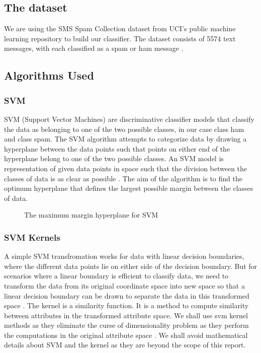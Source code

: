 \documentclass[9pt,twocolumn,twoside]{../../styles/osajnl}
\begin{document}
{\subsection{The dataset}
We are using the SMS Spam Collection dataset from UCI's
public machine learning repository to build our classifier. The
dataset consists of 5574 text messages, with each classified as a spam
or ham message \cite{www-sms_spam_collection}.

\subsection{Algorithms Used}

\subsubsection{SVM}
SVM (Support Vector Machines) are discriminative classifier models
that classify the data as belonging to one of the two possible
classes, in our case class ham and class spam. The SVM algorithm
attempts to categorize data by drawing a hyperplane between the data
points such that points on either end of the hyperplane belong to one
of the two possible classes. An SVM model is representation of given
data points in space such that the division between the classes of
data is as clear as possible \cite{www-svm-wiki}. The aim of the algorithm
is to find the optimum hyperplane that defines the largest possible
margin between the classes of data.

\begin{figure}[htbp]
\centering
{}
\caption{The maximum margin hyperplane for SVM \cite{www-svm-tutorial}}
\label{fig:The maximum margin hyperplane for SVM}
\end{figure}

\subsubsection{SVM Kernels}
A simple SVM transfromation works for data with linear decision
boundaries, where the different data points lie on either side of the
decision boundary. But for scenarios where a linear boundary is
efficient to classify data, we need to transform the data from its
original coordinate space into new space so that a linear decision
boundary can be drawn to separate the data in this transformed space
\cite{book-dataminingintroduction}. The kernel is a similarity
function. It is a method to compute similarity between attributes in
the transformed attribute space. We shall use svm kernel methods as
they eliminate the curse of dimensionality problem as they perform the
computations in the original attribute space
\cite{book-dataminingintroduction}. We shall avoid mathematical
details about SVM and the kernel as they are beyond the scope of this
report.\newline

}
\end{document}
